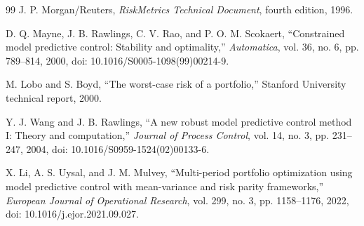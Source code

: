 \documentclass[11pt,a4paper]{article}
\begin{document}
\begin{thebibliography}{99}
J. P. Morgan/Reuters,
\emph{RiskMetrics Technical Document}, fourth edition, 1996.

D. Q. Mayne, J. B. Rawlings, C. V. Rao, and P. O. M. Scokaert,
``Constrained model predictive control: Stability and optimality,'' \emph{Automatica}, vol. 36, no. 6, pp. 789--814, 2000, doi: 10.1016/S0005-1098(99)00214-9.

M. Lobo and S. Boyd,
``The worst-case risk of a portfolio,'' Stanford University technical report, 2000.

Y. J. Wang and J. B. Rawlings,
``A new robust model predictive control method I: Theory and computation,'' \emph{Journal of Process Control}, vol. 14, no. 3, pp. 231--247, 2004, doi: 10.1016/S0959-1524(02)00133-6.

X. Li, A. S. Uysal, and J. M. Mulvey,
``Multi-period portfolio optimization using model predictive control with mean-variance and risk parity frameworks,'' \emph{European Journal of Operational Research}, vol. 299, no. 3, pp. 1158--1176, 2022, doi: 10.1016/j.ejor.2021.09.027.
\end{thebibliography}
\end{document}
